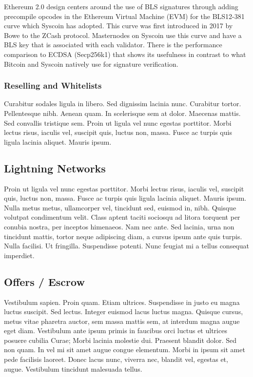 \documentclass[peerreview]{ieeesyscoin}
\begin{document}
Ethereum 2.0 design centers around the use of BLS signatures through adding precompile opcodes in the Ethereum Virtual Machine (EVM) for the BLS12-381 curve \cite{Dra18} which Syscoin has adopted. This curve was first introduced in 2017 by Bowe \cite{Bow17}  to the ZCash protocol. Masternodes on Syscoin use this curve and have a BLS key that is associated with each validator. There is the performance comparison to ECDSA (Secp256k1) \cite{Blo18} that shows its usefulness in contrast to what Bitcoin and Syscoin natively use for signature verification.

\subsubsection{Reselling and Whitelists}

Curabitur sodales ligula in libero. Sed dignissim lacinia nunc. Curabitur tortor. Pellentesque nibh. Aenean quam. In scelerisque sem at dolor. Maecenas mattis. Sed convallis tristique sem. Proin ut ligula vel nunc egestas porttitor. Morbi lectus risus, iaculis vel, suscipit quis, luctus non, massa. Fusce ac turpis quis ligula lacinia aliquet. Mauris ipsum. 

\subsection{Lightning Networks}
Proin ut ligula vel nunc egestas porttitor. Morbi lectus risus, iaculis vel, suscipit quis, luctus non, massa. Fusce ac turpis quis ligula lacinia aliquet. Mauris ipsum. Nulla metus metus, ullamcorper vel, tincidunt sed, euismod in, nibh. Quisque volutpat condimentum velit. Class aptent taciti sociosqu ad litora torquent per conubia nostra, per inceptos himenaeos. Nam nec ante. Sed lacinia, urna non tincidunt mattis, tortor neque adipiscing diam, a cursus ipsum ante quis turpis. Nulla facilisi. Ut fringilla. Suspendisse potenti. Nunc feugiat mi a tellus consequat imperdiet. 

\subsection{Offers / Escrow}
Vestibulum sapien. Proin quam. Etiam ultrices. Suspendisse in justo eu magna luctus suscipit. Sed lectus. Integer euismod lacus luctus magna. Quisque cursus, metus vitae pharetra auctor, sem massa mattis sem, at interdum magna augue eget diam. Vestibulum ante ipsum primis in faucibus orci luctus et ultrices posuere cubilia Curae; Morbi lacinia molestie dui. Praesent blandit dolor. Sed non quam. In vel mi sit amet augue congue elementum. Morbi in ipsum sit amet pede facilisis laoreet. Donec lacus nunc, viverra nec, blandit vel, egestas et, augue. Vestibulum tincidunt malesuada tellus. 
\end{document}
